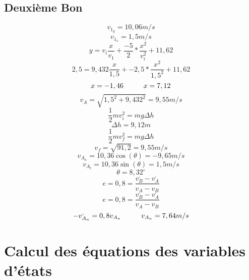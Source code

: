 \documentclass{article}
\begin{document}
\subsection{Deuxième Bon}
\begin{equation}
	v_{1_{y}} = 10,06 m/s 
\end{equation}
\begin{equation}
	v_{1_{x}} = 1,5 m/s 
\end{equation}
\begin{equation}
	y = v_{i}\frac{x}{v_{1}} + \frac{-5}{2}*\frac{x^2}{v_{i}^2} + 11,62
\end{equation}
\begin{equation}
	2,5 = 9,432\frac{x}{1,5} + -2,5*\frac{x^2}{1,5^2} + 11,62
\end{equation}
\begin{equation}
	x = -1,46  \hspace{10mm} x = 7,12
\end{equation}
\begin{equation}
	v_{A}=\sqrt{1,5^2 + 9,432^2} = 9,55 m/s
\end{equation}
\begin{equation}
	\frac{1}{2}mv_{i}^2 = mg\Delta h
\end{equation}
\begin{equation}
	\Delta h = 9,12m
\end{equation}
\begin{equation}
	\frac{1}{2}mv_{f}^2 = mg\Delta h
\end{equation}
\begin{equation}
	v_{f} = \sqrt{91,2} = 9,55 m/s
\end{equation}
\begin{equation}
	v_{A_{n}} = 10,36\cos(\theta ) = -9,65 m/s
\end{equation}
\begin{equation}
	v_{A_{t}} = 10,36\sin(\theta ) = 1,5 m/s
\end{equation}
\begin{equation}
	\theta = 8,32^{\circ}
\end{equation}
\begin{equation}
	e = 0,8 = \frac{v_{B}^,-v_{A}^,}{v_{A}-v_{B}}
\end{equation}
\begin{equation}
	e = 0,8 = \frac{v_{B}^,-v_{A}^,}{v_{A}-v_{B}}
\end{equation}
\begin{equation}
	-v_{A_{n}}^, = 0,8v_{A_{n}} 	\hspace{10mm}
	v_{A_{n}} = 7,64 m/s
\end{equation}
\section{Calcul des équations des variables d'états }
\end{document}
